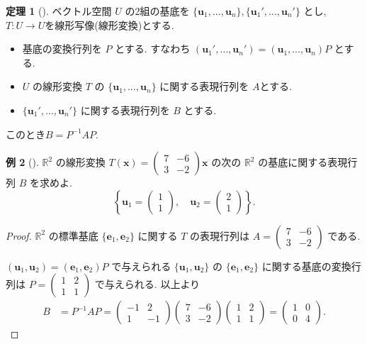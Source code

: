\documentclass[dvipdfmx,a4paper,11pt]{article} %
\theoremstyle{definition}
\newtheorem{thm}{定理}[section]
\newtheorem{eg}[thm]{例}
\begin{document}
\begingroup{}
\begin{thm}
[{\cite[定理5.2.2]{M}}]
\label{thm-M-5.2.2}
ベクトル空間 $U$ の2組の基底を
\(
\{\bm{u}_1,\ldots,\bm{u}_n\},
\{\bm{u}_1',\ldots,\bm{u}_n'\}
\)
とし, $T : U\to U$を線形写像(線形変換)とする.
\begin{itemize}
\item 基底の変換行列を $P$ とする. すなわち
\(
(\bm{u}_1',\ldots,\bm{u}_n')=(\bm{u}_1,\ldots,\bm{u}_n)P
\)
とする.
\item $U$ の線形変換 $T$ の $\{\bm{u}_1,\ldots,\bm{u}_n\}$ に関する表現行列を $A$とする. 
\item $\{\bm{u}_1',\ldots,\bm{u}_n'\}$ に関する表現行列を $B$ とする. 
\end{itemize}
このとき\(
B=P^{-1}AP.
\)
\end{thm}
\endgroup

\begin{eg}
[{\cite[例題5.2.2]{M}}]
$\mathbb{R}^2$ の線形変換
\(
T(\bm{x})=
\begin{pmatrix}
7&-6\\
3&-2
\end{pmatrix}
\bm{x}
\)
の次の $\mathbb{R}^2$ の基底に関する表現行列 $B$ を求めよ.
\[
\left\{
\bm{u}_1=
\begin{pmatrix}
1\\
1
\end{pmatrix},
\quad
\bm{u}_2=
\begin{pmatrix}
2\\
1
\end{pmatrix}
\right\}.
\]
\end{eg}

\begin{proof}
$\mathbb{R}^2$ の標準基底 $\{\bm{e}_1,\bm{e}_2\}$ に関する $T$ の表現行列は
\(
A=
\begin{pmatrix}
7&-6\\
3&-2
\end{pmatrix}
\)
である. 

\(
(\bm{u}_1,\bm{u}_2)=(\bm{e}_1,\bm{e}_2)P
\)
で与えられる $\{\bm{u}_1,\bm{u}_2\}$ の $\{\bm{e}_1,\bm{e}_2\}$ に関する基底の変換行列は
\(
P=
\begin{pmatrix}
1&2\\
1&1
\end{pmatrix}
\)
で与えられる.
以上より
\[
\begin{aligned}
B
&=P^{-1}AP
=
\begin{pmatrix}
-1&2\\
1&-1
\end{pmatrix}
\begin{pmatrix}
7&-6\\
3&-2
\end{pmatrix}
\begin{pmatrix}
1&2\\
1&1
\end{pmatrix}=
\begin{pmatrix}
1&0\\
0&4
\end{pmatrix}.
\end{aligned}
\]
\end{proof}
\end{document}
